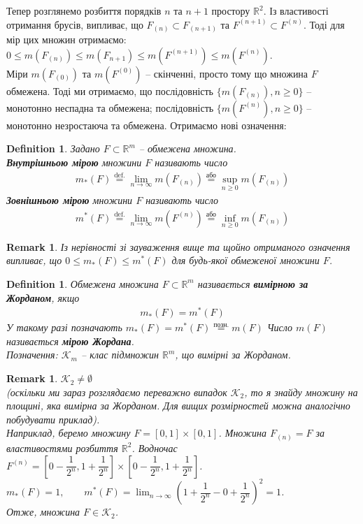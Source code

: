 \documentclass[a4paper, 10pt]{article}
\theoremstyle{theoremdd}
\theoremstyle{theoremdd}
\newtheorem{definition}[theorem]{Definition}
\theoremstyle{theoremdd}
\theoremstyle{theoremdd}
\theoremstyle{theoremdd}
\theoremstyle{theoremdd}
\theoremstyle{theoremdd}
\theoremstyle{theoremdd}
\theoremstyle{theoremdd}
\theoremstyle{theoremdd}
\theoremstyle{theoremdd}
\newtheorem{remark}[theorem]{Remark}
\theoremstyle{theoremdd}
\theoremstyle{theoremdd}
\theoremstyle{theoremdd}
\theoremstyle{theoremdd}
\begin{document}
Тепер розглянемо розбиття порядків $n$ та $n+1$ простору $\mathbb{R}^2$. Із властивості отримання брусів, випливає, що $F_{(n)} \subset F_{(n+1)}$ та $F^{(n+1)} \subset F^{(n)}$. Тоді для мір цих множин отримаємо:\\
$0 \leq m(F_{(n)}) \leq m(F_{n+1}) \leq m(F^{(n+1)}) \leq m(F^{(n)})$.\\
Міри $m(F_{(0)})$ та $m(F^{(0)})$ -- скінченні, просто тому що множина $F$ обмежена. Тоді ми отримаємо, що послідовність $\{m(F_{(n)}), n \geq 0\}$ -- монотонно неспадна та обмежена; послідовність $\{m(F^{(n)}), n \geq 0\}$ -- монотонно незростаюча та обмежена. Отримаємо нові означення:

\begin{definition}
Задано $F \subset \mathbb{R}^m$ -- обмежена множина.\\
\textbf{Внутрішньою мірою} множини $F$ називають число
\begin{align*}
m_*(F) \overset{\text{def.}}{=} \lim_{n \to \infty} m(F_{(n)}) \overset{\text{або}}{=} \sup_{n \geq 0} m(F_{(n)})
\end{align*}
\textbf{Зовнішньою мірою} множини $F$ називають число
\begin{align*}
m^*(F) \overset{\text{def.}}{=} \lim_{n \to \infty} m(F^{(n)}) \overset{\text{або}}{=} \inf_{n \geq 0} m(F_{(n)})
\end{align*}
\end{definition}

\begin{remark}
Із нерівності зі зауваження вище та щойно отриманого означення випливає, що $0 \leq m_*(F) \leq m^*(F)$ для будь-якої обмеженої множини $F$.
\end{remark}

\begin{definition}
Обмежена множина $F \subset \mathbb{R}^m$ називається \textbf{вимірною за Жорданом}, якщо
\begin{align*}
m_*(F) = m^*(F)
\end{align*}
У такому разі позначають $m_*(F) = m^*(F) \overset{\text{позн.}}{=} m(F)$ Число $m(F)$ називається \textbf{мірою Жордана}.\\
Позначення: $\mathcal{K}_m$ -- клас підмножин $\mathbb{R}^m$, що вимірні за Жорданом.
\end{definition}

\begin{remark}
$\mathcal{K}_2 \neq \emptyset$ \\
\textit{(оскільки ми зараз розглядаємо переважно випадок $\mathcal{K}_2$, то я знайду множину на площині, яка вимірна за Жорданом. Для вищих розмірностей можна аналогічно побудувати приклад)}.\\
Наприклад, беремо множину $F = [0,1] \times [0,1]$. Множина $F_{(n)} = F$ за властивостями розбиття $\mathbb{R}^2$. Водночас $F^{(n)} = \left[ 0 - \dfrac{1}{2^n}, 1+\dfrac{1}{2^n} \right] \times \left[0 - \dfrac{1}{2^n}, 1+\dfrac{1}{2^n} \right]$.\\
$m_*(F) = 1, \qquad m^*(F) = \displaystyle\lim_{n \to \infty} \left( 1+\dfrac{1}{2^n} - 0 + \dfrac{1}{2^n} \right)^2 = 1$.\\
Отже, множина $F \in \mathcal{K}_2$.
\end{remark}
\end{document}
